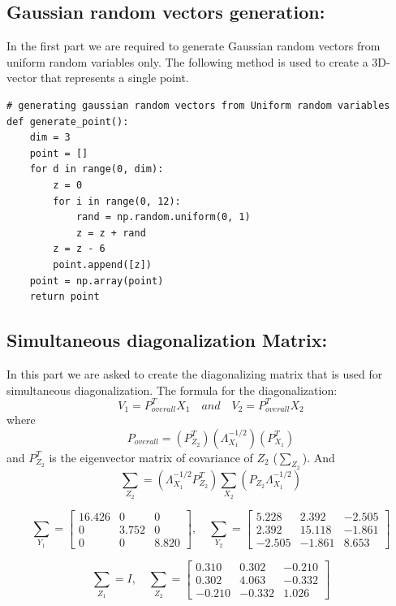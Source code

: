 \documentclass[11pt, oneside]{article}   	%
\begin{document}
\subsection{Gaussian random vectors generation:}
In the first part we are required to generate Gaussian random vectors from uniform random variables only. The following method is used to create a 3D-vector that represents a single point.
\begin{lstlisting}[label={list:first},caption=Gaussian vector generation]
# generating gaussian random vectors from Uniform random variables
def generate_point():
    dim = 3
    point = []
    for d in range(0, dim):
        z = 0
        for i in range(0, 12):
            rand = np.random.uniform(0, 1)
            z = z + rand
        z = z - 6
        point.append([z])
    point = np.array(point)
    return point
\end{lstlisting}


\subsection{Simultaneous diagonalization  Matrix:}
In this part we are asked to create the diagonalizing matrix that is used for simultaneous diagonalization. The formula for the diagonalization:
$$ V_1 = P_{overall}^T X_1 \quad and \quad V_2 = P_{overall}^T X_2$$
where 
$$P_{overall} = (P_{Z_2}^T)  (\Lambda_{X_1}^{-1/2}) (P_{X_1}^T)$$ 
and $P_{Z_2}^T$ is the eigenvector matrix of covariance of $Z_2$ ($\sum_{Z_2}$). And 
$$\sum_{Z_2} = (\Lambda_{X_1}^{-1/2}P_{Z_2}^T) \sum_{X_2} (P_{Z_2} \Lambda_{X_1}^{-1/2})$$

$$\sum_{Y_1} = \begin{bmatrix}
16.426 & 0 & 0 \\
0 & 3.752 & 0 \\
0 & 0 & 8.820 
\end{bmatrix}, \quad \sum_{Y_2} = \begin{bmatrix}
5.228 & 2.392 & -2.505 \\
2.392 & 15.118 & -1.861 \\
-2.505 & -1.861 & 8.653
\end{bmatrix}$$


$$\sum_{Z_1} = I, \quad \sum_{Z_2} = \begin{bmatrix}
0.310 & 0.302 & -0.210 \\
0.302 & 4.063 & -0.332 \\
-0.210 & -0.332 & 1.026 
\end{bmatrix}$$
\end{document}
